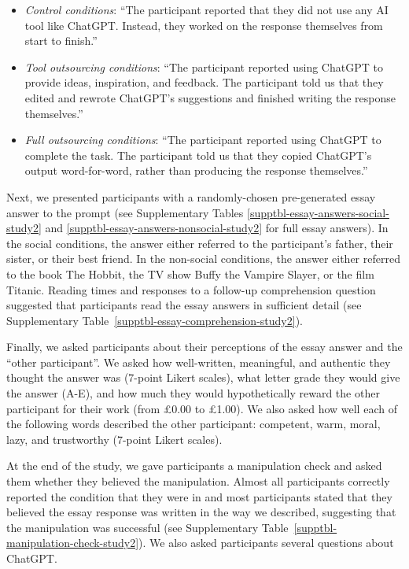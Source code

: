\documentclass[
  man,
  floatsintext,
  longtable,
  nolmodern,
  notxfonts,
  notimes,
  colorlinks=true,linkcolor=blue,citecolor=blue,urlcolor=blue]{apa7}
\providecommand{\tightlist}{%
  \setlength{\itemsep}{0pt}\setlength{\parskip}{0pt}}
\begin{document}
\begin{itemize}
\tightlist
\item
  \emph{Control conditions}: ``The participant reported that they did
  not use any AI tool like ChatGPT. Instead, they worked on the response
  themselves from start to finish.''
\item
  \emph{Tool outsourcing conditions}: ``The participant reported using
  ChatGPT to provide ideas, inspiration, and feedback. The participant
  told us that they edited and rewrote ChatGPT's suggestions and
  finished writing the response themselves.''
\item
  \emph{Full outsourcing conditions}: ``The participant reported using
  ChatGPT to complete the task. The participant told us that they copied
  ChatGPT's output word-for-word, rather than producing the response
  themselves.''
\end{itemize}

Next, we presented participants with a randomly-chosen pre-generated
essay answer to the prompt (see Supplementary Tables
\ref{supptbl-essay-answers-social-study2} and
\ref{supptbl-essay-answers-nonsocial-study2} for full essay answers). In
the social conditions, the answer either referred to the participant's
father, their sister, or their best friend. In the non-social
conditions, the answer either referred to the book The Hobbit, the TV
show Buffy the Vampire Slayer, or the film Titanic. Reading times and
responses to a follow-up comprehension question suggested that
participants read the essay answers in sufficient detail (see
Supplementary Table~\ref{supptbl-essay-comprehension-study2}).

Finally, we asked participants about their perceptions of the essay
answer and the ``other participant''. We asked how well-written,
meaningful, and authentic they thought the answer was (7-point Likert
scales), what letter grade they would give the answer (A-E), and how
much they would hypothetically reward the other participant for their
work (from £0.00 to £1.00). We also asked how well each of the following
words described the other participant: competent, warm, moral, lazy, and
trustworthy (7-point Likert scales).

At the end of the study, we gave participants a manipulation check and
asked them whether they believed the manipulation. Almost all
participants correctly reported the condition that they were in and most
participants stated that they believed the essay response was written in
the way we described, suggesting that the manipulation was successful
(see Supplementary Table~\ref{supptbl-manipulation-check-study2}). We
also asked participants several questions about ChatGPT.
\end{document}
